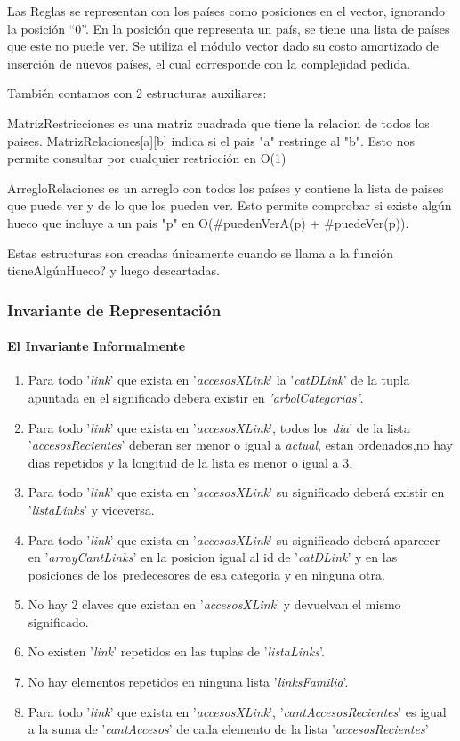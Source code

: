 \par Las Reglas se representan con los países como posiciones en el vector, ignorando la posición “0”. En la posición que representa un país, se tiene una lista de países que este no puede ver. Se utiliza el módulo vector dado su costo amortizado de inserción de nuevos países, el cual corresponde con la complejidad pedida.
\par También contamos con 2 estructuras auxiliares:
\par MatrizRestricciones es una matriz cuadrada que tiene la relacion de todos los paises. MatrizRelaciones[a][b] indica si el pais "a" restringe al "b". Esto nos permite consultar por cualquier restricción en O(1)
\par ArregloRelaciones es un arreglo con todos los países y contiene la lista de paises que puede ver y de lo que los pueden ver. Esto permite comprobar si existe algún hueco que incluye a un pais "p" en O($\#$puedenVerA(p) + $\#$puedeVer(p)).
\par Estas estructuras son creadas únicamente cuando se llama a la función tieneAlgúnHueco? y luego descartadas.

\subsubsection{Invariante de Representaci\'on}
\paragraph{El Invariante Informalmente}
\begin{enumerate}
\item Para todo '\textit{link}' que exista en '\textit{accesosXLink}' la '\textit{catDLink}' de la tupla apuntada en el significado debera existir en \textit{'arbolCategorias'}.
\item Para todo '\textit{link}' que exista en '\textit{accesosXLink}', todos los \textit{dia}' de la lista '\textit{accesosRecientes}' deberan ser menor o igual a \textit{actual}, estan ordenados,no hay dias repetidos y la longitud de la lista es menor o igual a 3.
\item Para todo '\textit{link}' que exista en '\textit{accesosXLink}' su significado deberá existir en '\textit{listaLinks}' y viceversa.
\item Para todo '\textit{link}' que exista en '\textit{accesosXLink}' su significado deberá aparecer en '\textit{arrayCantLinks}' en la posicion igual al id de '\textit{catDLink}' y en las posiciones de los predecesores de esa categoria y en ninguna otra.
\item No hay 2 claves que existan en '\textit{accesosXLink}' y devuelvan el mismo significado.
\item No existen '\textit{link}' repetidos en las tuplas de  '\textit{listaLinks}'.
\item No hay elementos repetidos en ninguna lista '\textit{linksFamilia}'.
\item Para todo '\textit{link}' que exista en '\textit{accesosXLink}', '\textit{cantAccesosRecientes}' es igual a la suma de '\textit{cantAccesos}' de cada elemento de la lista '\textit{accesosRecientes}'
\end{enumerate}

